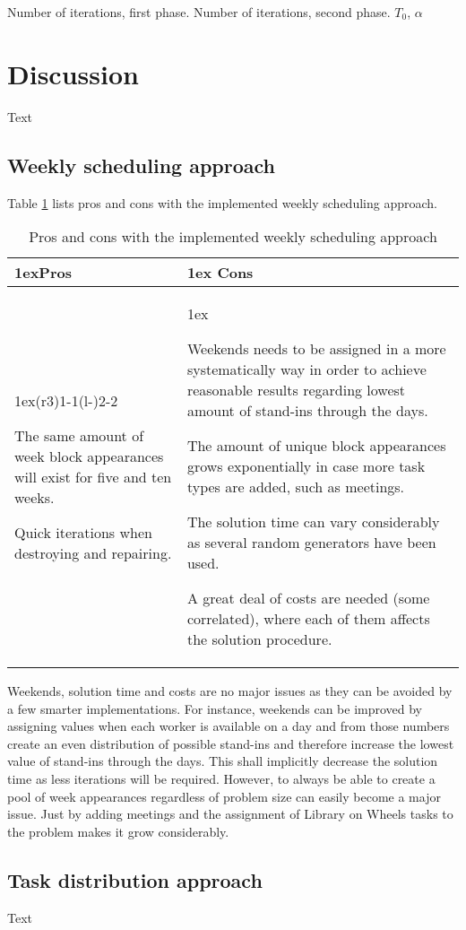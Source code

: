 Number of iterations, first phase.
Number of iterations, second phase.
$T_0$, $\alpha$


\section{Discussion}
Text


\subsection{Weekly scheduling approach}
Table \ref{pros_cons_weekly_scheduling} lists pros and cons with the implemented weekly scheduling approach.
\begin{table}[!h]
\caption{Pros and cons with the implemented weekly scheduling approach}
\label{pros_cons_weekly_scheduling}
\begin{tabularx}{\linewidth}{>{\parskip1ex}X@{\kern4\tabcolsep}>{\parskip1ex}X}
\toprule
\hfil\bfseries Pros
&
\hfil\bfseries Cons
\\\cmidrule(r{3\tabcolsep}){1-1}\cmidrule(l{-\tabcolsep}){2-2}

The same amount of week block appearances will exist for five and ten weeks.\par
Quick iterations when destroying and repairing.\par

&

Weekends needs to be assigned in a more systematically way in order to achieve reasonable results regarding lowest amount of stand-ins through the days.\par
The amount of unique block appearances grows exponentially in case more task types are added, such as meetings.\par
The solution time can vary considerably as several random generators have been used.\par
A great deal of costs are needed (some correlated), where each of them affects the solution procedure.

\\\bottomrule
\end{tabularx}
\end{table}

 Weekends, solution time and costs are no major issues as they can be avoided by a few smarter implementations. For instance, weekends can be improved by assigning values when each worker is available on a day and from those numbers create an even distribution of possible stand-ins and therefore increase the lowest value of stand-ins through the days. This shall implicitly decrease the solution time as less iterations will be required. However, to always be able to create a pool of week appearances regardless of problem size can easily become a major issue. Just by adding meetings and the assignment of Library on Wheels tasks to the problem makes it grow considerably.
 

\subsection{Task distribution approach}
Text